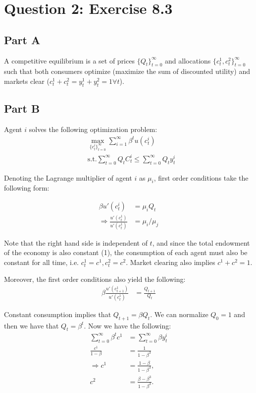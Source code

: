 \documentclass[11pt]{article} %
\begin{document}
\section{Question 2: Exercise 8.3}
\subsection{Part A}
A competitive equilibrium is a set of prices $\{Q_t\}_{t=0}^{\infty}$ and allocations $\{ c_t^1,c_t^2 \}_{t=0}^{\infty}$ such that both consumers optimize (maximize the sum of discounted utility) and markets clear ($c^1_t + c^2_t = y_t^1 + y_t^2 = 1 \forall t$).
\subsection{Part B}
Agent $i$ solves the following optimization problem:
\begin{align*}
&\max_{\{ c_{t}^i\}_{t=0}^{\infty}} \sum_{i=1}^{\infty}\beta^t u(c_{t}^i)\\
&\text{s.t.} \sum_{t=0}^{\infty}Q_tC_{t}^i \leq \sum_{t=0}^{\infty} Q_t y_{t}^i
\end{align*}

Denoting the Lagrange multiplier of agent $i$ as $\mu_i$, first order conditions take the following form:

\begin{align*}
\beta u'(c_t^i) &= \mu_i Q_t\\
\Rightarrow \frac{u'(c_t^1)}{u'(c_t^1)} &= \mu_i/\mu_j
\end{align*}

Note that the right hand side is independent of $t$, and since the total endowment of the economy is also constant (1), the consumption of each agent must also be constant for all time, i.e. $c_t^1 = c^1, c_t^2 = c^2.$ Market clearing also implies $c^1+c^2 = 1.$

Moreover, the first order conditions also yield the following:
\begin{align*}
\beta\frac{u'(c_{t+1}^1)}{u'(c_{t}^1)} &= \frac{Q_{t+1}}{Q_t}
\end{align*}

Constant consumption implies that $Q_{t+1} = \beta Q_t$. We can normalize $Q_0 = 1$ and then we have that $Q_{t} = \beta^t$. Now we have the following:
\begin{align*}
\sum_{t=0}^{\infty}\beta^t c^1 &= \sum_{t=0}^{\infty}\beta y_{t}^i\\
\frac{c^1}{1-\beta} &= \frac{1}{1-\beta^3}\\
\Rightarrow c^1 &= \frac{1-\beta}{1-\beta^3},\\
c^2 &= \frac{\beta - \beta^3}{1-\beta^3}.
\end{align*}
\end{document}
